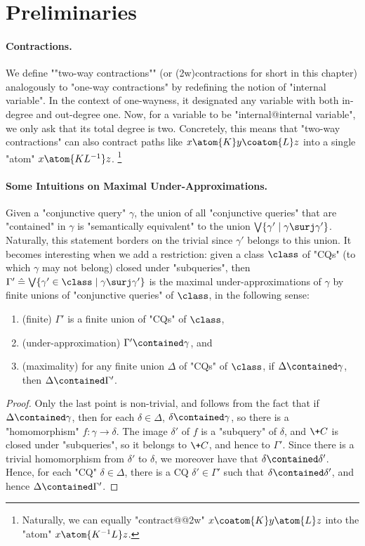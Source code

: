 \section{Preliminaries}
\label{sec:prelim}

\paragraph*{Contractions.}
We define \AP""two-way contractions"" (or \reintro(2w){contractions} for short in this chapter) analogously to "one-way contractions" by redefining
the notion of "internal variable".
In the context of one-wayness, it designated any variable with both in-degree and out-degree one.
Now, for a variable to be "internal@internal variable", we only ask that its total degree is two.
Concretely, this means that "two-way contractions" can also contract paths
like $x \atom{K} y \coatom{L} z $
into a single "atom" $x \atom{KL^{-1}} z$.%
\footnote{
	Naturally, we can equally "contract@@2w" 
	$x \coatom{K} y \atom{L} z$ into the "atom" $x \atom{K^{-1}L} z$.
}

\paragraph*{Some Intuitions on Maximal Under-Approximations.}
Given a "conjunctive query" $\gamma$,
the union of all "conjunctive queries"
that are "contained" in $\gamma$ is "semantically equivalent" to the union
$\bigvee \{ \gamma' \mid \gamma \surj \gamma' \}$. Naturally, this statement borders on the trivial since $\gamma'$ belongs to this union. It becomes interesting when we add a restriction:
given a class $\class$ of "CQs" (to which $\gamma$ may not belong) closed under "subqueries", then $\Gamma' \defeq \bigvee \{ \gamma' \in \class \mid \gamma \surj \gamma' \}$ is the maximal under-approximations
of $\gamma$ by finite unions of "conjunctive queries" of $\class$, in the following sense:
\begin{enumerate}[label=\roman*.]
	\item (finite) $\Gamma'$ is a finite union of "CQs" of $\class$,
	\item (under-approximation) $\Gamma' \contained \gamma$, and
	\item (maximality) for any finite union $\Delta$ of "CQs" of $\class$, if $\Delta \contained \gamma$, then $\Delta \contained \Gamma'$.
\end{enumerate}

\begin{proof}
Only the last point is non-trivial, and follows from the fact that if
$\Delta \contained \gamma$, then for each $\delta \in \Delta$, $\delta \contained \gamma$,
so there is a "homomorphism" $f\colon \gamma \to \delta$. The image $\delta'$
of $f$ is a "subquery" of $\delta$, and $\+C$ is closed under "subqueries",
so it belongs to $\+C$, and hence to $\Gamma'$. Since there is a trivial homomorphism
from $\delta'$ to $\delta$, we moreover have that $\delta \contained \delta'$.
Hence, for each "CQ" $\delta \in \Delta$, there is a CQ $\delta' \in \Gamma'$ such
that $\delta \contained \delta'$, and hence $\Delta \contained \Gamma'$.
\end{proof}

